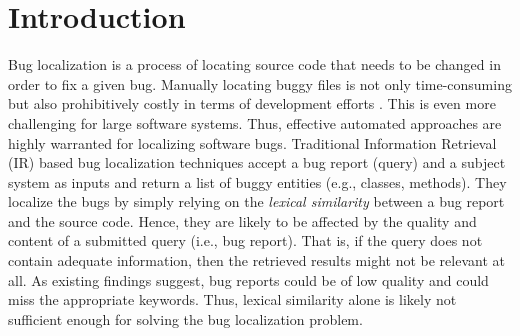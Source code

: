 \documentclass[sigconf,review,anonymous]{acmart}
\begin{document}
%

%


%

\maketitle



\section{Introduction}
Bug localization is a process of locating source code that needs to be changed in order to fix a given bug. 
Manually locating buggy files is not only time-consuming but also prohibitively costly in terms of development efforts \cite{Wang}. This is even more challenging for large software systems. Thus, effective automated approaches are highly warranted for localizing software bugs. 
Traditional Information Retrieval (IR) based bug localization techniques \cite{Saha,Jian} accept a bug report (query) and a subject system as inputs and return a list of buggy entities (e.g., classes, methods). They localize the bugs by simply relying on the \emph{lexical similarity} between a bug report and the source code. 
Hence, they are likely to be affected by the quality and content of a submitted query (i.e., bug report). That is, if the query does not contain adequate information, then the retrieved results might not be relevant at all. As existing findings \cite{parninireval,fse2018masud} suggest, bug reports could be of low quality and could miss the appropriate keywords. 
Thus, lexical similarity alone is likely not sufficient enough for solving the bug localization problem. 
\end{document}
